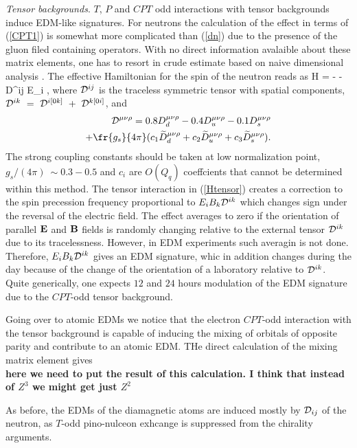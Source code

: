 \documentclass[prl,twocolumn,tightenlines,preprintnumbers,floatfix,nofootinbib]{revtex4}
\def\ba{\begin{eqnarray}}
\def\ea{\end{eqnarray}}
\begin{document}
{\em Tensor backgrounds}. $T$, $P$ and $CPT$ odd interactions with tensor backgrounds 
induce EDM-like signatures. For neutrons the calculation of the effect in terms of
(\ref{CPT1}) is somewhat more complicated than (\ref{dn}) due to the presence of 
the gluon filed containing operators. With no direct information avalaible about these
matrix elements, one has to resort in crude estimate based on naive dimensional analysis
\cite{GM}. The effective Hamiltonian for the spin of the neutron reads as
\be
H = -  \cdot {} - {\cal D}^{ij} E_i \cdot {},
\label{Htensor}
\ee
where ${\cal D}^{ij}$ is the traceless symmetric tensor with spatial components,
${\cal D}^{ik} ~=~ {\cal D}^{i[0k]} ~+~ {\cal D}^{k[0i]}$, and
\ba
{\cal D}^{\mu\nu\rho} = 0.8 D^{\mu\nu\rho}_d - 0.4 D^{\mu\nu\rho}_u - 0.1 D^{\mu\nu\rho}_s
\nonumber\\
+ \fr{g_s}{4\pi}(c_1 \widetilde{D}^{\mu\nu\rho}_d 
+c_2 \widetilde{D}^{\mu\nu\rho}_u + c_3 \widetilde{D}^{\mu\nu\rho}_s).
\ea
The strong coupling constants should be taken at low normalization point, 
$g_s/(4\pi) ~ \sim 0.3-0.5$ and $c_i$ are $O(Q_q)$ coeffcients that 
cannot be determined within this method. The tensor interaction in (\ref{Htensor})
creates a correction to the spin precession frequency proportional to 
$E_iB_k{\cal D}^{ik}$ which changes sign under the reversal of the electric field. 
The effect averages to zero if the orientation of 
parallel ${\bf E}$ and ${\bf B}$ fields is randomly changing relative to the 
external tensor  ${\cal D}^{ik}$ due to its tracelessness. However, in EDM experiments
such averagin is not done. Therefore, $E_iB_k{\cal D}^{ik}$ gives an EDM 
signature, whic in addition changes during the day because of the change of the 
orientation of a laboratory relative to ${\cal D}^{ik}$. Quite generically, 
one expects $12$ and $24$ hours modulation of the EDM signature due to 
the $CPT$-odd tensor background. 

Going over to atomic EDMs we notice that the electron $CPT$-odd interaction 
with the tensor background is capable of inducing the mixing of orbitals of 
opposite parity and contribute to an atomic EDM. THe direct calculation of 
the mixing matrix element gives\\
{\bf here we need to put the result of this calculation. I think that instead of $Z^3$ 
we might get just $Z^2$}

As before, the EDMs of the diamagnetic atoms are induced mostly by ${\cal D}_{ij}$
of the neutron, as $T$-odd pino-nulceon exhcange is suppressed from the 
chirality arguments.  
\end{document}

